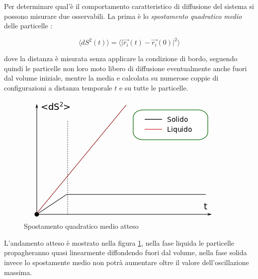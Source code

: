 \documentclass[11pt]{article}
\theoremstyle{plain}
\theoremstyle{remark}
\begin{document}
\begin{itemize}
Per determinare qual'è il comportamento caratteristico di diffusione del sistema si possono misurare due osservabili.
La prima è lo \emph{spostamento quadratico medio} delle particelle :

\begin{equation}
\biggr\langle dS^2(t) \biggr\rangle = \biggr\langle\big\vert \vec{r_i}(t) - \vec{r_i}(0) \big\vert^2  \biggr\rangle
\end{equation}

dove la distanza è misurata senza applicare la condizione di bordo, seguendo quindi le particelle non loro moto libero di diffusione eventualmente anche fuori dal volume iniziale, mentre la media e calcolata su numerose coppie di configurazioni a distanza temporale $t$ e su tutte le particelle.
	\begin{figure}
		\centering
		\includegraphics[scale=0.5]{Immagini/dS_quad_exp.png}
		\caption[Spostamento quadratico medio atteso]{Spostamento quadratico medio atteso}\label{fig: dS_quad_exp}
	\end{figure}
L'andamento atteso è mostrato nella figura \ref{fig: dS_quad_exp}, nella fase liquida le particelle propagheranno quasi linearmente diffondendo fuori dal volume, nella fase solida invece lo spostamente medio non potrà aumentare oltre il valore dell'oscillazione massima.


\end{itemize}
\end{document}
